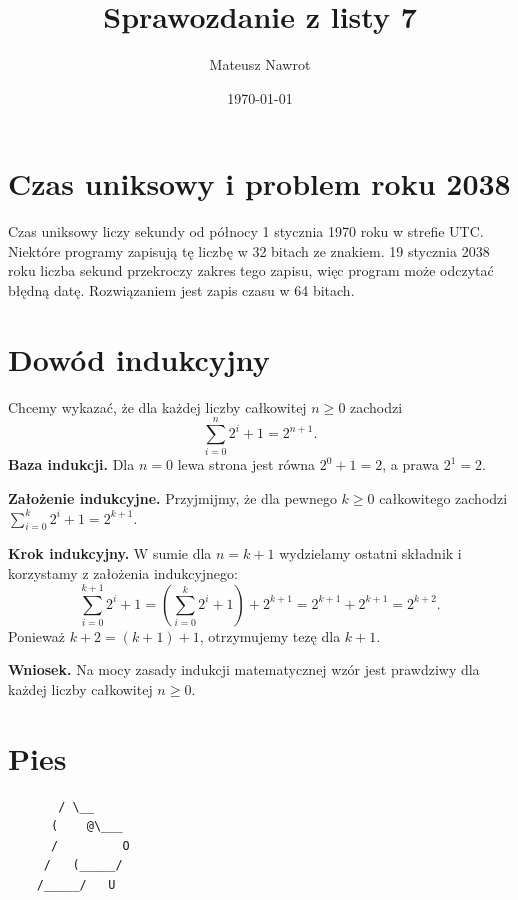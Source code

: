 \documentclass[a4paper]{article}
\author{Mateusz Nawrot}
\title{Sprawozdanie z listy 7}
\date{\today}
\begin{document}
\maketitle
\section{Czas uniksowy i problem roku 2038}
Czas uniksowy liczy sekundy od północy 1 stycznia 1970 roku w strefie UTC.
Niektóre programy zapisują tę liczbę w 32 bitach ze znakiem.
19 stycznia 2038 roku liczba sekund przekroczy zakres tego zapisu, więc program
może odczytać błędną datę. Rozwiązaniem jest zapis czasu w 64 bitach.
\section{Dowód indukcyjny}
Chcemy wykazać, że dla każdej liczby całkowitej \(n\geq 0\) zachodzi
\[
\sum_{i=0}^{n}2^i+1=2^{n+1}.
\]
\textbf{Baza indukcji.} Dla \(n=0\) lewa strona jest równa \(2^0+1=2\), a prawa \(2^1=2\).

\textbf{Założenie indukcyjne.} Przyjmijmy, że dla pewnego \(k\geq 0\) całkowitego zachodzi \(\sum_{i=0}^k 2^i+1=2^{k+1}\).

\textbf{Krok indukcyjny.} W sumie dla \(n=k+1\) wydzielamy ostatni składnik i korzystamy z założenia indukcyjnego:
\[
\sum_{i=0}^{k+1}2^i+1
=\left(\sum_{i=0}^{k}2^i+1\right)+2^{k+1}
=2^{k+1}+2^{k+1}=2^{k+2}.
\]
Ponieważ \(k+2=(k+1)+1\), otrzymujemy tezę dla \(k+1\).

\textbf{Wniosek.} Na mocy zasady indukcji matematycznej wzór jest prawdziwy dla każdej liczby całkowitej \(n\geq 0\).
\section{Pies}
\begin{verbatim}
       / \__
      (    @\___
      /         O
     /   (_____/
    /_____/   U
\end{verbatim}
\end{document}
